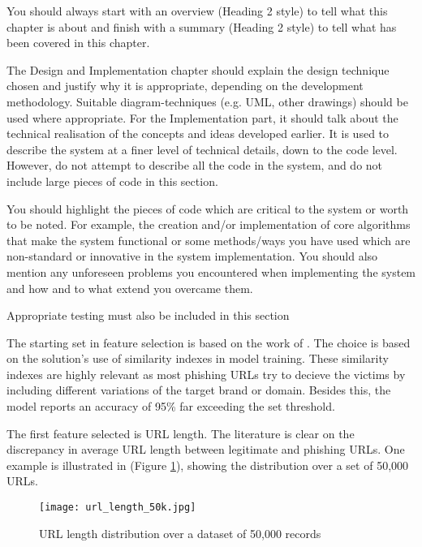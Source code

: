 \iffalse
	You should always start with an overview (Heading 2 style) to tell what this chapter is about and finish with a summary (Heading 2 style) to tell what has been covered in this chapter.

	The Design and Implementation chapter should explain the design technique chosen and justify why it is appropriate, depending on the development methodology.  Suitable diagram-techniques (e.g. UML, other drawings) should be used where appropriate. For the Implementation part, it should talk about the technical realisation of the concepts and ideas developed earlier. It is used to describe the system at a finer level of technical details, down to the code level. However, do not attempt to describe all the code in the system, and do not include large pieces of code in this section.

	You should highlight the pieces of code which are critical to the system or worth to be noted. For example, the creation and/or implementation of core algorithms that make the system functional or some methods/ways you have used which are non-standard or innovative in the system implementation. You should also mention any unforeseen problems you encountered when implementing the system and how and to what extend you overcame them.

	Appropriate testing must also be included in this section







	The starting set in feature selection is based on the work of \cite{SVM_SIMILARITY_INDEX}. The choice is based on the solution's use of similarity indexes in model training. These similarity indexes are highly relevant as most phishing URLs try to decieve the victims by including different variations of the target brand or domain. Besides this, the model reports an accuracy of 95\% far exceeding the set threshold.

	The first feature selected is URL length. The literature is clear on the discrepancy in average URL length between legitimate and phishing URLs. One example is illustrated in \cite{STACKED_ML_URL_HTML} (Figure \ref{fig:URL_LENGTH_DISTRIBUTION}), showing the distribution over a set of 50,000 URLs.

	\begin{figure}[t]
		\centering
		\texttt{[image: url\_length\_50k.jpg]}
		\caption{URL length distribution over a dataset of 50,000 records}
		\label{fig:URL_LENGTH_DISTRIBUTION}
	\end{figure}

